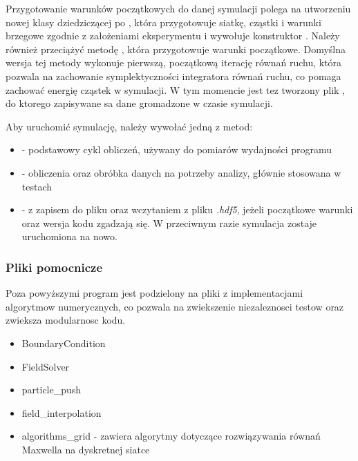{    Przygotowanie warunków początkowych do danej symulacji polega na utworzeniu
    nowej klasy dziedziczącej po , która przygotowuje siatkę,
    cząstki i warunki brzegowe zgodnie z założeniami eksperymentu i wywołuje
    konstruktor .  Należy również przeciążyć metodę
    , która przygotowuje warunki początkowe. Domyślna
    wersja tej metody wykonuje pierwszą, początkową iterację równań ruchu,
    która pozwala na zachowanie symplektyczności integratora równań ruchu,
     co pomaga zachować energię cząstek w symulacji.
    W tym momencie jest tez tworzony plik , do ktorego zapisywane sa
    dane gromadzone w czasie symulacji.

    Aby uruchomić symulację, należy wywołać jedną z metod:
    \begin{itemize}
         \item {} - podstawowy cykl obliczeń, używany do pomiarów
             wydajności programu
         \item {} - obliczenia oraz obróbka danych na potrzeby
             analizy, głównie stosowana w testach
         \item {} -  z zapisem do pliku oraz
             wczytaniem z pliku \emph{.hdf5}, jeżeli początkowe warunki oraz
             wersja kodu zgadzają się. W przeciwnym razie symulacja zostaje
             uruchomiona na nowo.
    \end{itemize}

    \subsubsection{Pliki pomocnicze}
    Poza powyższymi program jest podzielony na pliki z implementacjami algorytmow numerycznych,
    co pozwala na zwiekszenie niezaleznosci testow oraz zwieksza modularnosc kodu. 
    \begin{itemize}
        \item BoundaryCondition
        \item FieldSolver
        \item particle\_push
        \item field\_interpolation
        
        \item algorithms\_grid - zawiera algorytmy dotyczące rozwiązywania
            równań Maxwella na dyskretnej siatce
        

\end{itemize}}
